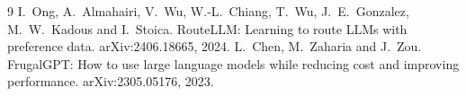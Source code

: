 \begin{thebibliography}{9}\small
{} I.~Ong, A.~Almahairi, V.~Wu, W.-L.~Chiang, T.~Wu, J.~E.~Gonzalez, M.~W.~Kadous and I.~Stoica.
  RouteLLM: Learning to route LLMs with preference data. arXiv:2406.18665, 2024.
 L.~Chen, M.~Zaharia and J.~Zou. FrugalGPT: How to use large language models while reducing cost
  and improving performance. arXiv:2305.05176, 2023.
\end{thebibliography}
